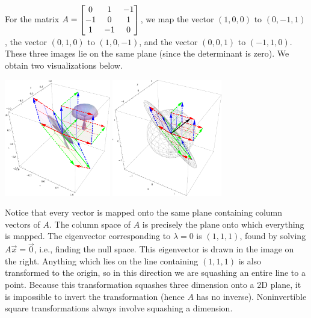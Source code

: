 \begin{example}
For the matrix 
$A=\begin{bmatrix}  0 & 1 & -1 \\ -1 & 0 & 1 \\ 1 & -1 & 0 \end{bmatrix}$, we map 
the vector $(1,0,0)$ to $(0,-1,1)$, 
the vector $(0,1,0)$ to $(1,0,-1)$, and 
the vector $(0,0,1)$ to $(-1,1,0)$. These three images lie on the same plane (since the determinant is zero).  We obtain two visualizations below. 
\begin{center}
\includegraphics[height=2in]{04-Linear-Transformations/support/LTsingular3da}
\includegraphics[height=2in]{04-Linear-Transformations/support/LTsingular3db}
\end{center}
Notice that every vector  is mapped onto the same plane containing column vectors of $A$. 
The column space of $A$ is precisely the plane onto which everything is mapped. 
The eigenvector corresponding to $\lambda =0$ is $(1,1,1)$, found by solving $A\vec x=\vec 0$, i.e., finding the null space.
This eigenvector is drawn in the image on the right.  
Anything which lies on the line containing $(1,1,1)$ is also transformed to the origin, so in this direction we are squashing an entire line to a point. 
Because this transformation squashes three dimension onto a 2D plane, it is impossible to invert the transformation (hence $A$ has no inverse). 
Noninvertible square transformations always involve squashing a dimension.

  
\end{example}

